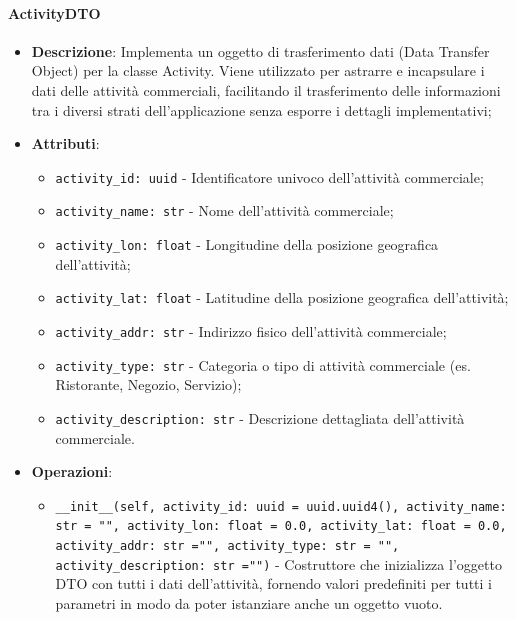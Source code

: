 \documentclass[10pt]{article}
\begin{document}
    \paragraph{ActivityDTO}
    \begin{itemize} 
    \item \textbf{Descrizione}: Implementa un oggetto di trasferimento dati (Data Transfer Object) per la classe Activity. Viene utilizzato per astrarre e incapsulare i dati delle attività commerciali, facilitando il trasferimento delle informazioni tra i diversi strati dell'applicazione senza esporre i dettagli implementativi;
    \item \textbf{Attributi}:
    \begin{itemize}
        \item \texttt{activity\_id: uuid} - Identificatore univoco dell'attività commerciale;
        \item \texttt{activity\_name: str} - Nome dell'attività commerciale;
        \item \texttt{activity\_lon: float} - Longitudine della posizione geografica dell'attività;
        \item \texttt{activity\_lat: float} - Latitudine della posizione geografica dell'attività;
        \item \texttt{activity\_addr: str} - Indirizzo fisico dell'attività commerciale;
        \item \texttt{activity\_type: str} - Categoria o tipo di attività commerciale (es. Ristorante, Negozio, Servizio);
        \item \texttt{activity\_description: str} - Descrizione dettagliata dell'attività commerciale.
    \end{itemize}
    
    \item \textbf{Operazioni}:
    \begin{itemize}
        \item \texttt{\_\_init\_\_(self, activity\_id: uuid = uuid.uuid4(), activity\_name: str = "", activity\_lon: float = 0.0, activity\_lat: float = 0.0, activity\_addr: str ="", activity\_type: str = "", activity\_description: str ="")} - Costruttore che inizializza l'oggetto DTO con tutti i dati dell'attività, fornendo valori predefiniti per tutti i parametri in modo da poter istanziare anche un oggetto vuoto.
    \end{itemize}
    \end{itemize}
    
\end{document}
